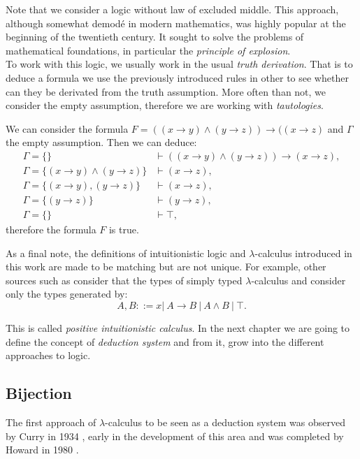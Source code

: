 Note that we consider a logic without law of excluded middle. This approach, although somewhat demodé in modern mathematics, was highly popular at the beginning of the twentieth century. It sought to solve the problems of mathematical foundations, in particular the \emph{principle of explosion}. \\


To work with this logic, we usually work in the usual \emph{truth derivation}. That is to deduce a formula we use the previously introduced rules in other to see whether can they be derivated from the truth assumption. More often than not, we consider the empty assumption, therefore we are working with \emph{tautologies}.

\begin{example}
  We can consider the formula $F=((x\to y) \land (y\to z)) \to ((x \to z)$ and $\Gamma$ the empty assumption. Then we can deduce:
  \begin{align*}
    \Gamma=\{\}& \vdash    ((x\to y) \land (y\to z)) \to (x\to z),\\
    \Gamma=\{(x\to y)\land (y\to z)\} & \vdash    (x \to z),\\
    \Gamma=\{(x\to y), (y\to z)\} & \vdash    (x \to z),\\
    \Gamma=\{ (y\to z)\} & \vdash    (y \to z),\\
    \Gamma=\{\} & \vdash \top,
  \end{align*}
  therefore the formula $F$ is true.
\end{example}





As a final note, the definitions of intuitionistic logic and $\lambda$-calculus introduced in this work are made to be matching but are not unique. For example, other sources such as  consider that the types of simply typed $\lambda$-calculus and consider only the types generated by:
$$A,B ::= x |\ A\to B\ |\ A \land B \ |\ \top .$$

This is called \emph{positive intuitionistic calculus}. In the next chapter we are going to define the concept of \emph{deduction system} and from it, grow into the different approaches to logic.



\subsection{Bijection}
The first approach of $\lambda$-calculus to be seen as a deduction system was observed by Curry in 1934 \cite{curry1934functionality}, early in the development of this area and was completed by Howard in 1980 \cite{howard1980formulae}. \\%



